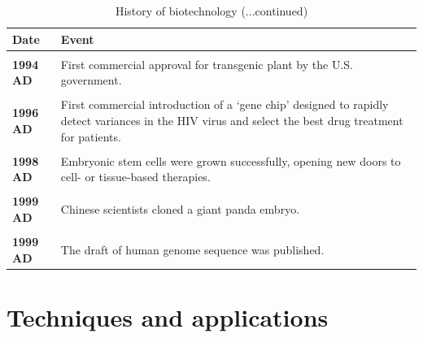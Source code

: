 \documentclass[
  ignorenonframetext,
  aspectratio=169]{beamer}
\begin{document}
\begin{frame}{}
\protect\hypertarget{section-3}{}
\begin{table}

\caption{\label{tab:biotechnology-history3}History of biotechnology (...continued)}
\centering
\fontsize{5}{7}\selectfont
\begin{tabular}[t]{>{}l>{\raggedright\arraybackslash}p{40em}}
\toprule
Date & Event\\
\midrule
\textbf{\cellcolor{gray!6}{1992 AD}} & \cellcolor{gray!6}{Techniques for testing embryos for inherited diseases were developed}\\
\textbf{1994 AD} & First commercial approval for transgenic plant by the U.S. government.\\
\textbf{\cellcolor{gray!6}{1995 AD}} & \cellcolor{gray!6}{First successful xenotransplantation trial was conducted, transplanting a heart from a genetically-engineered pig into a baboon.}\\
\textbf{1996 AD} & First commercial introduction of a ‘gene chip’ designed to rapidly detect variances in the HIV virus and select the best drug treatment for patients.\\
\textbf{\cellcolor{gray!6}{1996 AD}} & \cellcolor{gray!6}{Dolly, the sheep was cloned from a cell of an adult sheep.}\\
\addlinespace
\textbf{1998 AD} & Embryonic stem cells were grown successfully, opening new doors to cell- or tissue-based therapies.\\
\textbf{\cellcolor{gray!6}{1999 AD}} & \cellcolor{gray!6}{A U.S. company announced the successful cloning of human embryonic cells from an adult skin cell.}\\
\textbf{1999 AD} & Chinese scientists cloned a giant panda embryo.\\
\textbf{\cellcolor{gray!6}{1999 AD}} & \cellcolor{gray!6}{Indian scientists and companies started producing recombinant vaccines, hormones, and other drugs.}\\
\textbf{1999 AD} & The draft of human genome sequence was published.\\
\bottomrule
\end{tabular}
\end{table}
\end{frame}

\hypertarget{techniques-and-applications}{%
\section{Techniques and
applications}\label{techniques-and-applications}}
\end{document}
